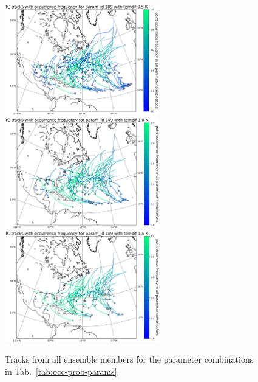 \begin{figure}[ht]
	\centering
	\includegraphics[width=0.6\textwidth]{img/tc_tracks_occ_prob_pid_109_temdif_05.png}
	\\[\smallskipamount]
	\includegraphics[width=0.6\textwidth]{img/tc_tracks_occ_prob_pid_149_temdif_10.png}
	\\[\smallskipamount]
	\includegraphics[width=0.6\textwidth]{img/tc_tracks_occ_prob_pid_189_temdif_15.png}
	\caption{Tracks from all ensemble members for the parameter combinations in Tab.~\ref{tab:occ-prob-params}.}
	\label{fig:occ-prob}
\end{figure}
